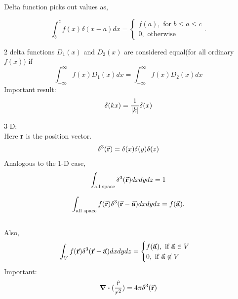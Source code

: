 \documentclass[12pt, oneside]{book}
\begin{document}
\begin{itemize}
Delta function picks out values as,

$$\int_{b}^{c}f(x)\delta(x-a)dx=
\begin{cases}
	f(a), \text{ for } b\leq a \leq c\\
	0, \text{ otherwise }
\end{cases}.
$$

2 delta functions $D_1(x)$ and $D_2(x)$ are considered equal(for all ordinary $f(x)$) if 
\begin{equation}
	\int_{-\infty}^{\infty}f(x)D_1(x)dx=\int_{-\infty}^{\infty}f(x)D_2(x)dx
\end{equation}
Important result:
\begin{equation}
	\delta(kx)=\frac{1}{\abs{k}}\delta(x) \\
\end{equation}

3-D:\\

Here \textbf{r} is the position vector.
\begin{equation}
	\delta^3(\va{r})=\delta(x)\delta(y)\delta(z)
\end{equation}
Analogous to the 1-D case,
\begin{equation}
	\int_{\text{all space}}\delta^3(\va{r})dx dy dz=1
\end{equation}

\begin{equation}
	\int_{\text{all space}}f(\va{r})\delta^3(\va{r}-\va{a})dx dy dz=f(\va{a}).
\end{equation}\\
Also, 
\begin{equation}
	\int_V f(\va{r})\delta^3(\va{r}-\va{a})dx dy dz= 
	\begin{cases}
		f(\va{a}), \text{ if } \va{a}\in V\\
		0,\text{ if } \va{a} \not\in V
	\end{cases}
\end{equation}
Important:
\begin{equation}
	\div{(\frac{\hat{r}}{r^2})}=4\pi\delta^3(\va{r}) 
\end{equation}


\end{itemize}
\end{document}
